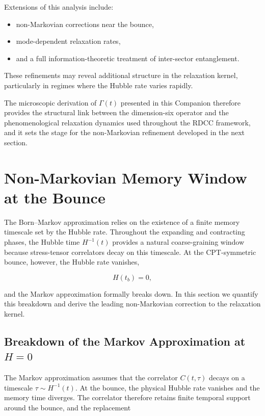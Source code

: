 \documentclass[11pt,a4paper]{article}
\begin{document}
Extensions of this analysis include:

\begin{itemize}
    \item non-Markovian corrections near the bounce,
    \item mode-dependent relaxation rates,
    \item and a full information-theoretic treatment of inter-sector
          entanglement.
\end{itemize}

These refinements may reveal additional structure in the relaxation kernel,
particularly in regimes where the Hubble rate varies rapidly.

The microscopic derivation of \(\Gamma(t)\) presented in this Companion therefore
provides the structural link between the dimension-six operator and the
phenomenological relaxation dynamics used throughout the RDCC framework, and it
sets the stage for the non-Markovian refinement developed in the next section.

\section{Non-Markovian Memory Window at the Bounce}

The Born--Markov approximation relies on the existence of a finite memory
timescale set by the Hubble rate. Throughout the expanding and contracting
phases, the Hubble time \(H^{-1}(t)\) provides a natural coarse-graining window
because stress-tensor correlators decay on this timescale. At the
CPT-symmetric bounce, however, the Hubble rate vanishes,


\[
H(t_b) = 0,
\]


and the Markov approximation formally breaks down. In this section we quantify
this breakdown and derive the leading non-Markovian correction to the
relaxation kernel.

\subsection{Breakdown of the Markov Approximation at \texorpdfstring{\(H=0\)}{H=0}}

The Markov approximation assumes that the correlator \(C(t,\tau)\) decays on a
timescale \(\tau \sim H^{-1}(t)\). At the bounce, the physical Hubble rate
vanishes and the memory time diverges. The correlator therefore retains finite
temporal support around the bounce, and the replacement
\end{document}
